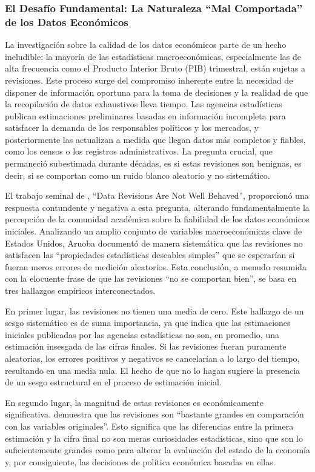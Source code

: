 \documentclass{article}
\begin{document}
\subsubsection{El Desafío Fundamental: La Naturaleza ``Mal Comportada'' de los Datos Económicos}

La investigación sobre la calidad de los datos económicos parte de un hecho ineludible: la mayoría de las estadísticas macroeconómicas, especialmente las de alta frecuencia como el Producto Interior Bruto (PIB) trimestral, están sujetas a revisiones. Este proceso surge del compromiso inherente entre la necesidad de disponer de información oportuna para la toma de decisiones y la realidad de que la recopilación de datos exhaustivos lleva tiempo. Las agencias estadísticas publican estimaciones preliminares basadas en información incompleta para satisfacer la demanda de los responsables políticos y los mercados, y posteriormente las actualizan a medida que llegan datos más completos y fiables, como los censos o los registros administrativos. La pregunta crucial, que permaneció subestimada durante décadas, es si estas revisiones son benignas, es decir, si se comportan como un ruido blanco aleatorio y no sistemático.

El trabajo seminal de \citet{aruoba2008}, ``Data Revisions Are Not Well Behaved'', proporcionó una respuesta contundente y negativa a esta pregunta, alterando fundamentalmente la percepción de la comunidad académica sobre la fiabilidad de los datos económicos iniciales. Analizando un amplio conjunto de variables macroeconómicas clave de Estados Unidos, Aruoba documentó de manera sistemática que las revisiones no satisfacen las ``propiedades estadísticas deseables simples'' que se esperarían si fueran meros errores de medición aleatorios. Esta conclusión, a menudo resumida con la elocuente frase de que las revisiones ``no se comportan bien'', se basa en tres hallazgos empíricos interconectados.

En primer lugar, las revisiones no tienen una media de cero. Este hallazgo de un sesgo sistemático es de suma importancia, ya que indica que las estimaciones iniciales publicadas por las agencias estadísticas no son, en promedio, una estimación insesgada de las cifras finales. Si las revisiones fueran puramente aleatorias, los errores positivos y negativos se cancelarían a lo largo del tiempo, resultando en una media nula. El hecho de que no lo hagan sugiere la presencia de un sesgo estructural en el proceso de estimación inicial.

En segundo lugar, la magnitud de estas revisiones es económicamente significativa. \citet{aruoba2008} demuestra que las revisiones son ``bastante grandes en comparación con las variables originales''. Esto significa que las diferencias entre la primera estimación y la cifra final no son meras curiosidades estadísticas, sino que son lo suficientemente grandes como para alterar la evaluación del estado de la economía y, por consiguiente, las decisiones de política económica basadas en ellas.
\end{document}
